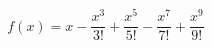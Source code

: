 \documentclass[preview]{standalone}
\begin{document}
\begin{align*}
f(x)=x-\dfrac{x^3}{3!}+\dfrac{x^5}{5!}-\dfrac{x^7}{7!}+\dfrac{x^9}{9!}
\end{align*}
\end{document}
